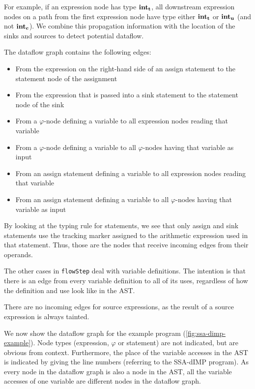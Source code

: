 For example, if an expression node has type $\textbf{int}_\textbf{t}$,
all downstream expression nodes on a path from the first expression node 
have type either $\textbf{int}_\textbf{t}$ or $\textbf{int}_\textbf{u}$ (and not $\textbf{int}_\textbf{c}$).
We combine this propagation information with the location of the sinks and sources 
to detect potential dataflow.


The dataflow graph contains the following edges:
\begin{itemize}
    \item From the expression on the right-hand side of an assign statement 
    to the statement node of the assignment
    \item From the expression that is passed into a sink statement to the statement node
    of the sink
    \item From a $\varphi$-node defining a variable to all expression nodes reading 
    that variable
    \item From a $\varphi$-node defining a variable to all $\varphi$-nodes having
    that variable as input
    \item From an assign statement defining a variable to all expression nodes reading 
    that variable
    \item From an assign statement defining a variable to all $\varphi$-nodes having
    that variable as input
\end{itemize}

By looking at the typing rule for statements, we see that only assign and sink statements
use the tracking marker assigned to the arithmetic expression used in that statement.
Thus, those are the nodes that receive incoming edges from their operands.

The other cases in \texttt{flowStep} deal with variable definitions.
The intention is that there is an edge from every variable definition to all of its uses,
regardless of how the definition and use look like in the AST.

There are no incoming edges for source expressions, as the result of a source expression
is always tainted.

We now show the dataflow graph for the example program (\autoref{fig:ssa-dimp-example}).
Node types (expression, $\varphi$ or statement) are not indicated, but are obvious from context.
Furthermore, the place of the variable accesses in the AST is indicated by giving the 
line numbers (referring to the SSA-dIMP program).
As every node in the dataflow graph is also a node in the AST, all the variable accesses
of one variable are different nodes in the dataflow graph.

